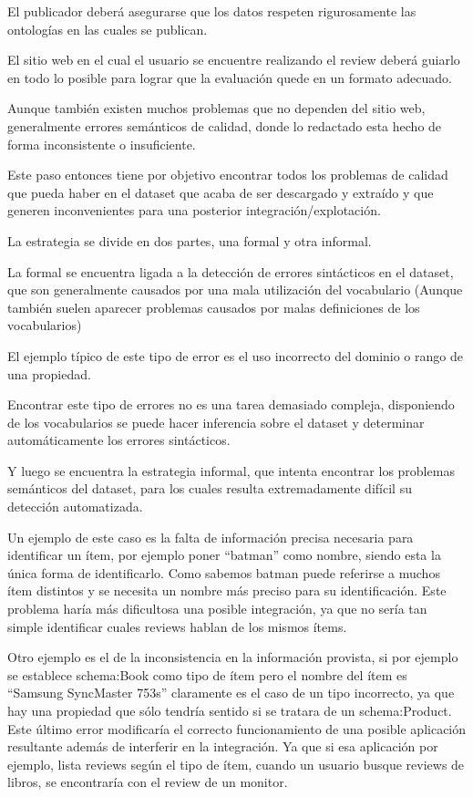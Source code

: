 El publicador deberá asegurarse que los datos respeten rigurosamente las ontologías en las cuales se publican.

El sitio web en el cual el usuario se encuentre realizando el review deberá guiarlo en todo lo posible para lograr que la evaluación
quede en un formato adecuado.


Aunque también existen muchos problemas que no dependen del sitio web, generalmente errores semánticos de calidad, donde lo 
redactado esta hecho de forma inconsistente o insuficiente.


Este paso entonces tiene por objetivo encontrar todos los problemas de calidad que pueda haber en el dataset que acaba de 
ser descargado y extraído y que generen inconvenientes para una posterior integración/explotación.

La estrategia se divide en dos partes, una formal y otra informal.

La formal se encuentra ligada a la detección de errores sintácticos en el dataset, que son generalmente causados por una mala utilización del vocabulario (Aunque también suelen aparecer problemas causados por malas definiciones de los vocabularios)

El ejemplo típico de este tipo de error es el uso incorrecto del dominio o rango de una propiedad. 

Encontrar este tipo de errores no es una tarea demasiado compleja, disponiendo de los vocabularios se puede hacer inferencia sobre el dataset y determinar automáticamente los errores sintácticos.

Y luego se encuentra la estrategia informal, que intenta encontrar los problemas semánticos del dataset, para los cuales resulta extremadamente difícil su detección automatizada.

Un ejemplo de este caso es la falta de información precisa necesaria para identificar un ítem, por ejemplo poner ``batman'' como nombre, siendo esta la única forma de identificarlo. Como sabemos batman puede referirse a muchos ítem distintos y se necesita un nombre más preciso para su identificación.
Este problema haría más dificultosa una posible integración, ya que no sería tan simple identificar cuales reviews hablan de los mismos ítems.

Otro ejemplo es el de la inconsistencia en la información provista, si por ejemplo se establece schema:Book como tipo de ítem pero el nombre del ítem es ``Samsung SyncMaster 753s'' claramente es el caso de un tipo incorrecto, ya que hay una propiedad que sólo tendría sentido si se tratara de un schema:Product.
Este último error modificaría el correcto funcionamiento de una posible aplicación resultante además de interferir en la integración. Ya que si esa aplicación por ejemplo, lista reviews según el tipo de ítem, cuando un usuario busque reviews de libros, se encontraría con el review de un monitor.

